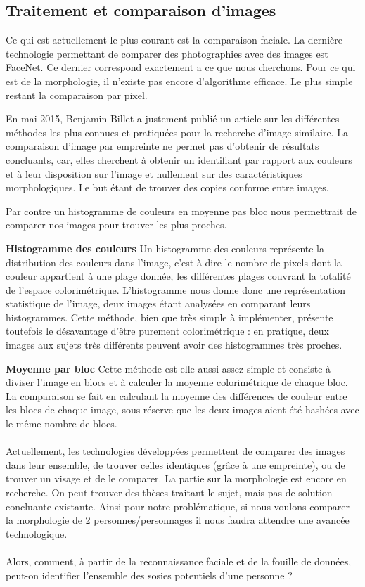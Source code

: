 \documentclass[a4paper,12pt]{article}
\begin{document}
\subsection{Traitement et comparaison d'images}
Ce qui est actuellement le plus courant est la comparaison faciale. La dernière technologie permettant de comparer des photographies avec des images est FaceNet. Ce dernier correspond exactement a ce que nous cherchons. 
Pour ce qui est de la morphologie, il n'existe pas encore d'algorithme efficace. Le plus simple restant la comparaison par pixel. 

En mai 2015, Benjamin Billet a justement publié un article sur les différentes méthodes les plus connues et pratiquées pour la recherche d'image similaire. La comparaison d'image par empreinte ne permet pas d'obtenir de résultats concluants, car, elles cherchent à obtenir un identifiant par rapport aux couleurs et à leur disposition sur l'image et nullement sur des caractéristiques morphologiques. Le but étant de trouver des copies conforme entre images. 

Par contre un histogramme de couleurs en moyenne pas bloc nous permettrait de comparer nos images pour trouver les plus proches. 

\textbf{Histogramme des couleurs}
Un histogramme des couleurs représente la distribution des couleurs dans l'image, c'est-à-dire le nombre de pixels dont la couleur appartient à une plage donnée, les différentes plages couvrant la totalité de l'espace colorimétrique. L'histogramme nous donne donc une représentation statistique de l'image, deux images étant analysées en comparant leurs histogrammes. Cette méthode, bien que très simple à implémenter, présente toutefois le désavantage d'être purement colorimétrique : en pratique, deux images aux sujets très différents peuvent avoir des histogrammes très proches.

\textbf{Moyenne par bloc}
Cette méthode est elle aussi assez simple et consiste à diviser l'image en blocs et à calculer la moyenne colorimétrique de chaque bloc. La comparaison se fait en calculant la moyenne des différences de couleur entre les blocs de chaque image, sous réserve que les deux images aient été hashées avec le même nombre de blocs. 
\\\\
Actuellement, les technologies développées permettent de comparer des images dans leur ensemble, de trouver celles identiques (grâce à une empreinte), ou de trouver un visage et de le comparer. La partie sur la morphologie est encore en recherche. On peut trouver des thèses traitant le sujet, mais pas de solution concluante existante. Ainsi pour notre problématique, si nous voulons comparer la morphologie de 2 personnes/personnages il nous faudra attendre une avancée technologique. 
\\\\
Alors, comment, à partir de la reconnaissance faciale et de la fouille de données, peut-on identifier l’ensemble des sosies potentiels d’une personne ?
\end{document}
